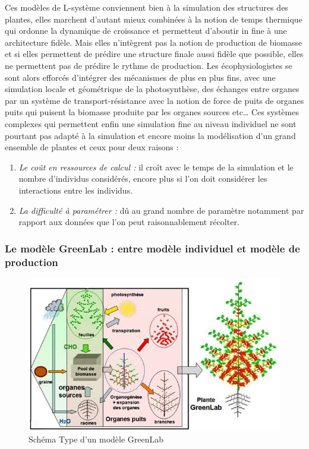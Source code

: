 {Ces modèles de L-système conviennent bien à la simulation des structures des plantes, elles marchent d’autant mieux combinées à la notion de temps thermique qui ordonne la dynamique de croissance et permettent d’aboutir in fine à une architecture fidèle. Mais elles n’intègrent pas la notion de production de biomasse et si elles permettent de prédire une structure finale aussi fidèle que possible, elles ne permettent pas de prédire le rythme de production. Les écophysiologistes se sont alors efforcés d’intégrer des mécanismes de plus en plus fins, avec une simulation locale et géométrique de la photosynthèse, des échanges entre organes par un système de transport-résistance avec la notion de force de puits de organes puits qui puisent la biomasse produite par les organes sources etc… Ces systèmes complexes qui permettent enfin une simulation fine au niveau individuel ne sont pourtant pas adapté à la simulation et encore moins la modélisation d’un grand ensemble de plantes et ceux pour deux raisons : 
\begin{enumerate}
\item \emph{Le coût en ressources de calcul :} il croît avec le temps de la simulation et le nombre d’individus considérés, encore plus si l’on doit considérer les interactions entre les individus.
\item \emph{La difficulté à paramétrer :} dû au grand nombre de paramètre notamment par rapport aux données que l’on peut raisonnablement récolter.
\end{enumerate}

\subsubsection[Le modèle GreenLab]{Le modèle GreenLab : entre modèle individuel et modèle de production}

\begin{figure}[h]
	\begin{center}
	
	
  \includegraphics[scale=1.0]{./img/sGL.jpg}
  \caption{Schéma Type d'un modèle GreenLab}
  \label{fig:schémaGL}
  

\end{center}
\end{figure}}
